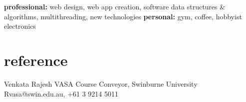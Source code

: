 \documentclass[]{friggeri-cv} %
\begin{document}
\textbf{professional:} web design, web app creation, software data structures \& algorithms, multithreading, new technologies \textbf{personal:} gym, coffee, hobbyist electronics


\section{reference}

\begin{entrylist}
\entry
{}
{Venkata Rajesh VASA}
{Course Conveyor, Swinburne University}
{Rvasa@swin.edu.au, +61 3 9214 5011}
\end{entrylist}
\end{document}
